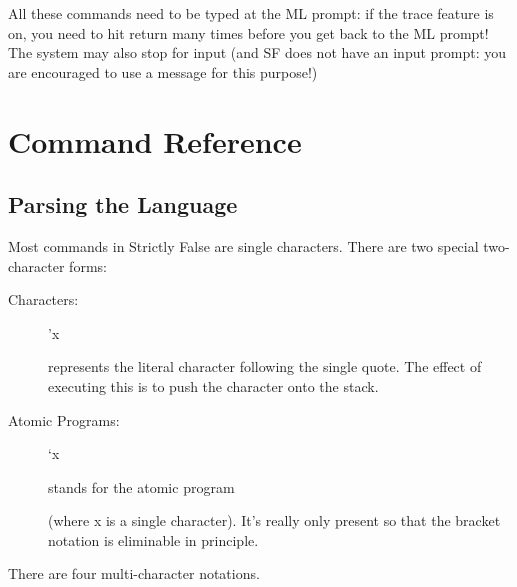 \documentclass[12pt]{article}
\begin{document}
All these commands need to be typed at the ML prompt:  if the trace
feature is on, you need to hit return many times before you get back to the
ML prompt!  The system may also stop for input (and SF does not have
an input prompt:  you are encouraged to use a message for this purpose!)

\section{Command Reference}

\subsection{Parsing the Language}

Most commands in Strictly False are single characters.  There
are two special two-character forms:

\begin{description}

\item[Characters:] \begin{verb} 'x \end{verb} represents the literal
character following the single quote.  The effect of executing this
is to push the character onto the stack.

\item[Atomic Programs:] \begin{verb} `x \end{verb} stands for the
atomic program \begin{verb} [x] \end{verb} (where x is a single
character).  It's really only present so that the bracket notation is
eliminable in principle.

\end{description}

There are four multi-character notations.
\end{document}
